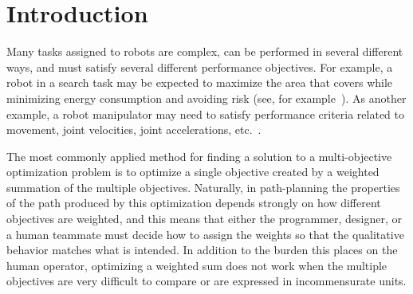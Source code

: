\documentclass[conference]{IEEEtran}
\begin{document}
\IEEEpeerreviewmaketitle

\section{Introduction}
\label{sec:intro}

Many tasks assigned to robots are complex, can be performed in several different ways, and must satisfy several different performance objectives.  
For example, a robot in a search task may be expected to maximize the area that covers while minimizing energy consumption and avoiding risk (see, for example~\cite{yi2014supporting,mei2005deployment}). 
As another example, a robot manipulator may need to satisfy performance criteria  related to movement, joint velocities, joint accelerations, etc.~\cite{Pires2004}.


The most commonly applied method for finding a solution to a multi-objective optimization problem is to optimize a single objective created by a weighted summation of the multiple objectives.  
Naturally, in path-planning the properties of the path produced by this optimization depends strongly on how different objectives are weighted, and this means that either the programmer, designer, or a human teammate must decide how to assign the weights so that the qualitative behavior matches what is intended.  
In addition to the burden this places on the human operator, optimizing a weighted sum does not work when the multiple objectives are very difficult to compare or are expressed in incommensurate units.
\end{document}
